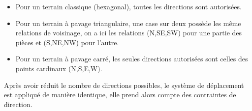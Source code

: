         \begin{itemize}
            \item Pour un terrain classique (hexagonal), toutes les directions sont autorisées.
            \item Pour un terrain à pavage triangulaire, une case sur deux possède les même relations de voisinage, on a ici les relations (N,SE,SW) pour une partie des pièces et (S,NE,NW) pour l'autre.
            \item Pour un terrain à pavage carré, les seules directions autorisées sont celles des points cardinaux (N,S,E,W).
        \end{itemize}
        \medbreak
        Après avoir réduit le nombre de directions possibles, le système de déplacement est appliqué de manière identique, elle prend alors compte des contraintes de direction. \newline
